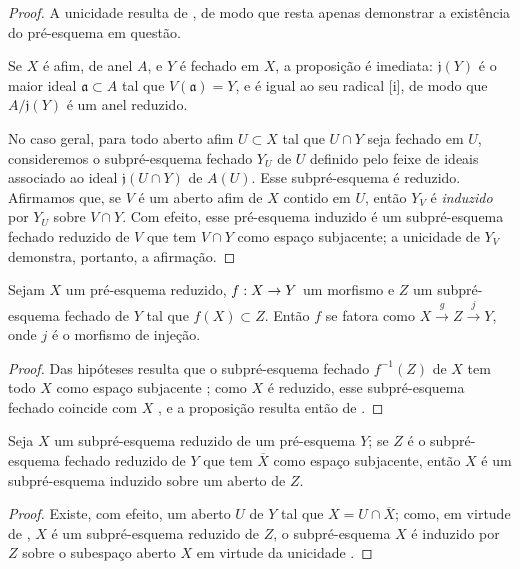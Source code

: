 \documentclass[oneside]{amsart}
\makeatletter
\newcommand{\ega@arrow}[2]{\mathchoice{#1}{#2}{#2}{#2}}
\renewcommand{\to}{\ega@arrow{\longrightarrow}{\rightarrow}}
\newcommand{\oldpage}[2][]{{\marginnote{\normalfont\textbf{#1}~|~#2}}\ignorespaces}
\let\EGAOriginalLabel\label
\renewcommand{\label}[1]{\phantomsection\EGAOriginalLabel{#1}}
\makeatother
\begin{document}
\begin{proof}
A unicidade resulta de , de modo que resta apenas demonstrar a existência do pré-esquema em questão.

Se $X$ é afim, de anel $A$, e $Y$ é fechado em $X$, a proposição é imediata:
$\mathfrak{j}(Y)$ é o maior ideal $\mathfrak{a}\subset A$ tal que $V(\mathfrak{a})=Y$, e é igual ao seu radical [i], de modo que $A/\mathfrak{j}(Y)$ é um anel reduzido.

No caso geral, para todo aberto afim $U\subset X$ tal que $U\cap Y$ seja fechado em $U$, consideremos o subpré-esquema fechado $Y_U$ de $U$ definido pelo feixe de ideais associado ao ideal $\mathfrak{j}(U\cap Y)$ de $A(U)$.
Esse subpré-esquema é reduzido.
Afirmamos que, se $V$ é um aberto afim de $X$ contido em $U$, então $Y_V$ é \emph{induzido} por $Y_U$ sobre $V\cap Y$.
Com efeito, esse pré-esquema induzido é um subpré-esquema fechado reduzido de $V$ que tem $V\cap Y$ como espaço subjacente;
a unicidade de $Y_V$ demonstra, portanto, a afirmação.
\end{proof}

\begin{proposition}[5.2.2]
\label{I.5.2.2}
Sejam $X$ um pré-esquema reduzido, $f:X \to Y$ um morfismo e $Z$ um subpré-esquema fechado de $Y$ tal que $f(X) \subset Z$.
Então $f$ se fatora como $X \xrightarrow{g} Z \xrightarrow{j} Y$, onde $j$ é o morfismo de injeção.
\end{proposition}

\begin{proof}
Das hipóteses resulta que o subpré-esquema fechado $f^{-1}(Z)$ de $X$ tem todo $X$ como espaço subjacente ;
como $X$ é reduzido, esse subpré-esquema fechado coincide com $X$ , e a proposição resulta então de .
\end{proof}

\begin{corollary}[5.2.3]
\label{I.5.2.3}
Seja $X$ um subpré-esquema reduzido de um pré-esquema $Y$; se $Z$ é o subpré-esquema fechado reduzido de $Y$ que tem $\overline{X}$ como espaço subjacente, então $X$ é um subpré-esquema induzido sobre um aberto de $Z$.
\end{corollary}

\begin{proof}
\oldpage[I]{132}
Existe, com efeito, um aberto $U$ de $Y$ tal que $X=U\cap\overline{X}$;
como, em virtude de , $X$ é um subpré-esquema reduzido de $Z$, o subpré-esquema $X$ é induzido por $Z$ sobre o subespaço aberto $X$ em virtude da unicidade .
\end{proof}
\end{document}
